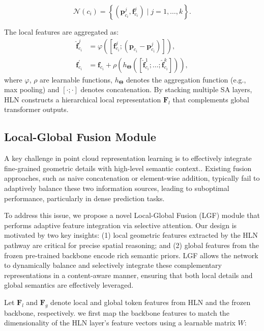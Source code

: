 \begin{equation}
    \mathcal{N}(c_i) = \left\{(\mathbf{p}_{c_i}^j, \mathbf{f}_{c_i}^j) \mid j = 1, \dots, k \right\}.
\end{equation}

The local features are aggregated as:
\begin{align}
    \hat{\mathbf{f}}_{c_i}^{j} &= \varphi\left(\left[\mathbf{f}_{c_i}^{j}; (\mathbf{p}_{c_i} - \mathbf{p}_{c_i}^j)\right]\right), \\
    \mathbf{f}_{c_i}^{\prime} &= \mathbf{f}_{c_i} + \rho\left(h_{\boldsymbol{\Theta}}([\hat{\mathbf{f}}_{c_i}^{1}; \dots; \hat{\mathbf{f}}_{c_i}^{k}])\right),
\end{align}
where $\varphi$, $\rho$ are learnable functions, $h_{\boldsymbol{\Theta}}$ denotes the aggregation function (e.g., max pooling) and $[\cdot ; \cdot]$ denotes concatenation. By stacking multiple SA layers, HLN constructs a hierarchical local representation $\mathbf{F}_l$ that complements global transformer outputs.

\subsection{Local-Global Fusion Module}
\label{sec:LGF}

A key challenge in point cloud representation learning is to effectively integrate fine-grained geometric details with high-level semantic context.. Existing fusion approaches, such as naive concatenation or element-wise addition, typically fail to adaptively balance these two information sources, leading to suboptimal performance, particularly in dense prediction tasks.

To address this issue, we propose a novel Local-Global Fusion (LGF) module that performs adaptive feature integration via selective attention. Our design is motivated by two key insights: (1) local geometric features extracted by the HLN pathway are critical for precise spatial reasoning; and (2) global features from the frozen pre-trained backbone encode rich semantic priors. LGF allows the network to dynamically balance and selectively integrate these complementary representations in a content-aware manner, ensuring that both local details and global semantics are effectively leveraged.

Let $\mathbf{F}_l$ and $\mathbf{F}_g$ denote local and global token features from HLN and the frozen backbone, respectively. we first map the backbone features to match the dimensionality of the HLN layer’s feature vectors using a learnable matrix $W$:

